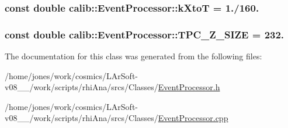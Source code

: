 \hypertarget{classcalib_1_1EventProcessor_a562211bed340e1e30cb8abe3d50b5000}{
\subsubsection[{k\-Xto\-T}]{\setlength{\rightskip}{0pt plus 5cm}const double calib\-::\-Event\-Processor\-::k\-Xto\-T = 1./160.}}\label{classcalib_1_1EventProcessor_a562211bed340e1e30cb8abe3d50b5000}
\hypertarget{classcalib_1_1EventProcessor_a5d575b3b15c62a4c48b7e407847db92c}{
\subsubsection[{T\-P\-C\-\_\-\-Z\-\_\-\-S\-I\-Z\-E}]{\setlength{\rightskip}{0pt plus 5cm}const double calib\-::\-Event\-Processor\-::\-T\-P\-C\-\_\-\-Z\-\_\-\-S\-I\-Z\-E = 232.}}\label{classcalib_1_1EventProcessor_a5d575b3b15c62a4c48b7e407847db92c}


The documentation for this class was generated from the following files\-:\begin{DoxyCompactItemize}
\item 
/home/jones/work/cosmics/\-L\-Ar\-Soft-\/v08\-\_\-\_/work/scripts/rhi\-Ana/srcs/\-Classes/\hyperlink{EventProcessor_8h}{Event\-Processor.\-h}\item 
/home/jones/work/cosmics/\-L\-Ar\-Soft-\/v08\-\_\-\_/work/scripts/rhi\-Ana/srcs/\-Classes/\hyperlink{EventProcessor_8cpp}{Event\-Processor.\-cpp}\end{DoxyCompactItemize}

